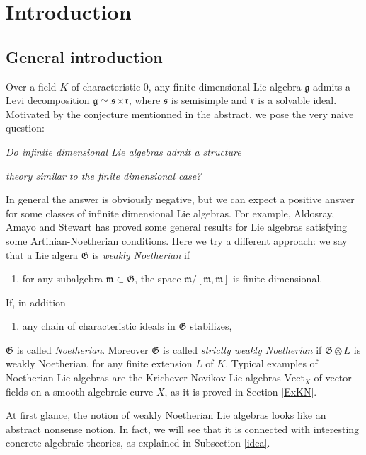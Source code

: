 \documentclass[11pt, letterpaper, reqno]{amsart}
\theoremstyle{definition}
\newcommand{\g}{\mathfrak g}
\newcommand{\fg}{\mathfrak{g}}
\newcommand{\fm}{\mathfrak{m}}
\newcommand{\fr}{\mathfrak{r}}
\newcommand{\fs}{\mathfrak{s}}
\newcommand{\fG}{\mathfrak{G}}
\newcommand{\Vect}{\mathrm{Vect}}
\begin{document}
\section*{Introduction} 

\subsection{General introduction}
Over  a field $K$ of characteristic 0,
any  finite dimensional Lie algebra $\g$
admits a Levi decomposition 
$\fg\simeq\fs\ltimes \fr$, where $\fs$ is 
semisimple and $\fr$ is a solvable ideal.
Motivated by the conjecture 
mentionned in the abstract, we pose the 
 very naive question:

\hskip1cm{\it Do infinite dimensional Lie algebras
admit a structure }

\hskip1cm {\it  theory similar to the finite dimensional case?}

\noindent In general the answer is obviously negative, but we can expect a positive answer for some classes of infinite dimensional Lie algebras. For example, Aldosray, Amayo and Stewart
\cite{ AS1,AS2,Amayo-Stewart, Stewart}
has proved some general results for Lie algebras satisfying some Artinian-Noetherian  conditions. 
Here we try a different approach:
we say that a Lie algera $\fG$ is {\it weakly   Noetherian} if
\begin{enumerate}
\item[(a)] for any subalgebra $\fm\subset\fG$,
the space $\fm/
[\fm,\fm]$ is finite dimensional.
\end{enumerate}
If, in addition
\begin{enumerate}
\item[(b)] any chain of 
characteristic ideals in $\fG$ stabilizes,
\end{enumerate}
\noindent $\fG$ is called {\it Noetherian}. Moreover $\fG$ is called
{\it strictly weakly Noetherian} if $\fG\otimes L$ is weakly Noetherian, for any finite extension $L$ of $K$.
Typical examples of Noetherian Lie algebras are the Krichever-Novikov Lie algebras $\Vect_X$ of vector fields on a smooth algebraic curve $X$, as it is proved in
Section \ref{ExKN}. 

At first glance, the notion of 
weakly Noetherian Lie algebras looks like an abstract nonsense notion.
In fact, we will see that it
is connected with interesting concrete algebraic theories, as explained  in Subsection
\ref{idea}.
\end{document}
